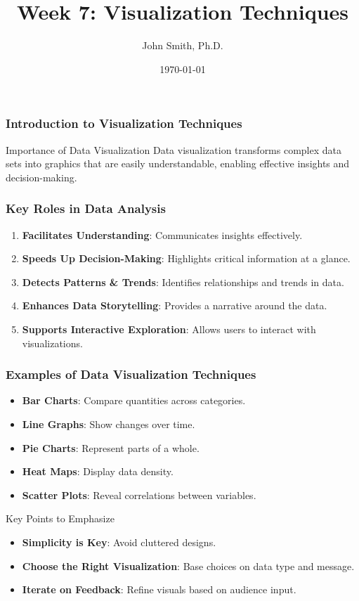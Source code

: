 \documentclass[aspectratio=169]{beamer}
\title[Week 7: Visualization Techniques]{Week 7: Visualization Techniques}
\author[J. Smith]{John Smith, Ph.D.}
\institute[University Name]{
  Department of Computer Science\\
  University Name
}
\date{\today}
\begin{document}
\frame{\titlepage}

\begin{frame}[fragile]
    \frametitle{Introduction to Visualization Techniques}
    \begin{block}{Importance of Data Visualization}
        Data visualization transforms complex data sets into graphics that are easily understandable, enabling effective insights and decision-making.
    \end{block}
\end{frame}

\begin{frame}[fragile]
    \frametitle{Key Roles in Data Analysis}
    \begin{enumerate}
        \item \textbf{Facilitates Understanding}: Communicates insights effectively.
        \item \textbf{Speeds Up Decision-Making}: Highlights critical information at a glance.
        \item \textbf{Detects Patterns \& Trends}: Identifies relationships and trends in data.
        \item \textbf{Enhances Data Storytelling}: Provides a narrative around the data.
        \item \textbf{Supports Interactive Exploration}: Allows users to interact with visualizations.
    \end{enumerate}
\end{frame}

\begin{frame}[fragile]
    \frametitle{Examples of Data Visualization Techniques}
    \begin{itemize}
        \item \textbf{Bar Charts}: Compare quantities across categories.
        \item \textbf{Line Graphs}: Show changes over time.
        \item \textbf{Pie Charts}: Represent parts of a whole.
        \item \textbf{Heat Maps}: Display data density.
        \item \textbf{Scatter Plots}: Reveal correlations between variables.
    \end{itemize}
    
    \begin{block}{Key Points to Emphasize}
        \begin{itemize}
            \item \textbf{Simplicity is Key}: Avoid cluttered designs.
            \item \textbf{Choose the Right Visualization}: Base choices on data type and message.
            \item \textbf{Iterate on Feedback}: Refine visuals based on audience input.
        \end{itemize}
    \end{block}
\end{frame}
\end{document}
